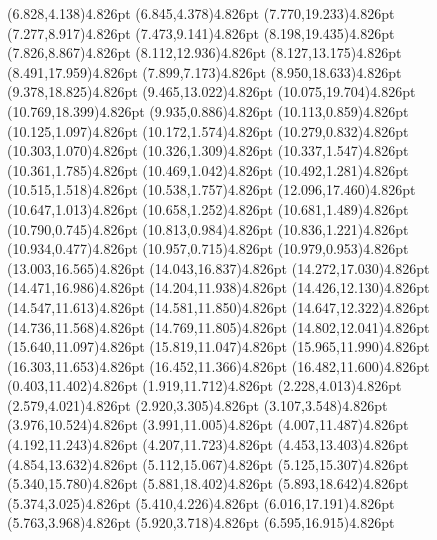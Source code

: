 \documentclass[10pt]{article}
\begin{document}
{{\qdisk(6.828,4.138){4.826pt}%
\qdisk(6.845,4.378){4.826pt}%
\qdisk(7.770,19.233){4.826pt}%
\qdisk(7.277,8.917){4.826pt}%
\qdisk(7.473,9.141){4.826pt}%
\qdisk(8.198,19.435){4.826pt}%
\qdisk(7.826,8.867){4.826pt}%
\qdisk(8.112,12.936){4.826pt}%
\qdisk(8.127,13.175){4.826pt}%
\qdisk(8.491,17.959){4.826pt}%
\qdisk(7.899,7.173){4.826pt}%
\qdisk(8.950,18.633){4.826pt}%
\qdisk(9.378,18.825){4.826pt}%
\qdisk(9.465,13.022){4.826pt}%
\qdisk(10.075,19.704){4.826pt}%
\qdisk(10.769,18.399){4.826pt}%
\qdisk(9.935,0.886){4.826pt}%
\qdisk(10.113,0.859){4.826pt}%
\qdisk(10.125,1.097){4.826pt}%
\qdisk(10.172,1.574){4.826pt}%
\qdisk(10.279,0.832){4.826pt}%
\qdisk(10.303,1.070){4.826pt}%
\qdisk(10.326,1.309){4.826pt}%
\qdisk(10.337,1.547){4.826pt}%
\qdisk(10.361,1.785){4.826pt}%
\qdisk(10.469,1.042){4.826pt}%
\qdisk(10.492,1.281){4.826pt}%
\qdisk(10.515,1.518){4.826pt}%
\qdisk(10.538,1.757){4.826pt}%
\qdisk(12.096,17.460){4.826pt}%
\qdisk(10.647,1.013){4.826pt}%
\qdisk(10.658,1.252){4.826pt}%
\qdisk(10.681,1.489){4.826pt}%
\qdisk(10.790,0.745){4.826pt}%
\qdisk(10.813,0.984){4.826pt}%
\qdisk(10.836,1.221){4.826pt}%
\qdisk(10.934,0.477){4.826pt}%
\qdisk(10.957,0.715){4.826pt}%
\qdisk(10.979,0.953){4.826pt}%
\qdisk(13.003,16.565){4.826pt}%
\qdisk(14.043,16.837){4.826pt}%
\qdisk(14.272,17.030){4.826pt}%
\qdisk(14.471,16.986){4.826pt}%
\qdisk(14.204,11.938){4.826pt}%
\qdisk(14.426,12.130){4.826pt}%
\qdisk(14.547,11.613){4.826pt}%
\qdisk(14.581,11.850){4.826pt}%
\qdisk(14.647,12.322){4.826pt}%
\qdisk(14.736,11.568){4.826pt}%
\qdisk(14.769,11.805){4.826pt}%
\qdisk(14.802,12.041){4.826pt}%
\qdisk(15.640,11.097){4.826pt}%
\qdisk(15.819,11.047){4.826pt}%
\qdisk(15.965,11.990){4.826pt}%
\qdisk(16.303,11.653){4.826pt}%
\qdisk(16.452,11.366){4.826pt}%
\qdisk(16.482,11.600){4.826pt}%
\dummycolor
\qdisk(0.403,11.402){4.826pt}%
\qdisk(1.919,11.712){4.826pt}%
\qdisk(2.228,4.013){4.826pt}%
\qdisk(2.579,4.021){4.826pt}%
\qdisk(2.920,3.305){4.826pt}%
\qdisk(3.107,3.548){4.826pt}%
\qdisk(3.976,10.524){4.826pt}%
\qdisk(3.991,11.005){4.826pt}%
\qdisk(4.007,11.487){4.826pt}%
\qdisk(4.192,11.243){4.826pt}%
\qdisk(4.207,11.723){4.826pt}%
\qdisk(4.453,13.403){4.826pt}%
\qdisk(4.854,13.632){4.826pt}%
\qdisk(5.112,15.067){4.826pt}%
\qdisk(5.125,15.307){4.826pt}%
\qdisk(5.340,15.780){4.826pt}%
\qdisk(5.881,18.402){4.826pt}%
\qdisk(5.893,18.642){4.826pt}%
\qdisk(5.374,3.025){4.826pt}%
\qdisk(5.410,4.226){4.826pt}%
\qdisk(6.016,17.191){4.826pt}%
\qdisk(5.763,3.968){4.826pt}%
\qdisk(5.920,3.718){4.826pt}%
\qdisk(6.595,16.915){4.826pt}%
}}
\end{document}
